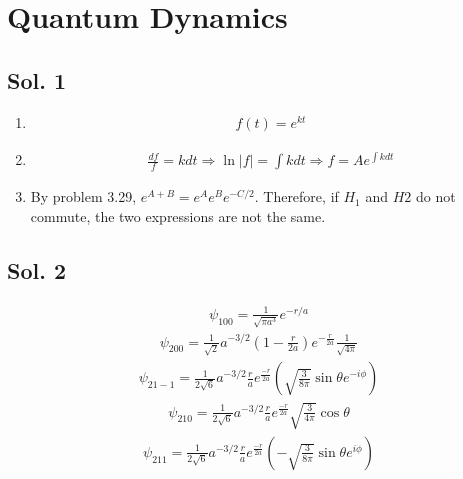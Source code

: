 \section{Quantum Dynamics}
\subsection*{Sol. 1}
\begin{enumerate}
    \item
          \begin{align*}
              f(t) = e^{kt}
          \end{align*}
    \item
          \begin{align*}
              \frac{df}{f} = kdt\Rightarrow
              \ln |f| =\int k dt
              \Rightarrow
              f = Ae^{\int k dt }
          \end{align*}
    \item
          By problem 3.29,
          $e^{A+B} = e^A e^B e^{-C/2}$. Therefore, if $H_1$ and $H2$ do not commute, the two expressions are not the same.
\end{enumerate}

\subsection*{Sol. 2}
\begin{align*}
    \psi_{100} = \frac{1}{\sqrt{\pi a^3}}e^{-r/a}
\end{align*}
\begin{align*}
    \psi_{200} = \frac{1}{\sqrt{2}}a^{-3/2}\left(1 - \frac{r}{2a}\right)e^{-\frac{r}{2a}}\frac{1}{\sqrt{4\pi}}
\end{align*}
\begin{align*}
    \psi_{21-1} =
    \frac{1}{2\sqrt{6}}a^{-3/2}\frac{r}{a}
    e^{\frac{-r}{2a}}
    \left(
    \sqrt{\frac{3}{8\pi}}\sin\theta e^{-i\phi}
    \right)
\end{align*}
\begin{align*}
    \psi_{210} =
    \frac{1}{2\sqrt{6}}a^{-3/2}\frac{r}{a}
    e^{\frac{-r}{2a}}
    \sqrt{\frac{3}{4\pi}}\cos\theta
\end{align*}
\begin{align*}
    \psi_{211} = \frac{1}{2\sqrt{6}}a^{-3/2}\frac{r}{a}
    e^{\frac{-r}{2a}}
    \left(-
    \sqrt{\frac{3}{8\pi}}\sin\theta e^{i\phi}
    \right)
\end{align*}


